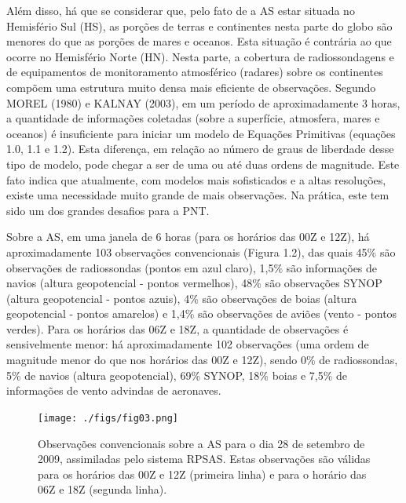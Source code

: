 Além disso, há que se considerar que, pelo fato de a AS estar situada no Hemisfério Sul (HS), as porções de terras e continentes nesta parte do globo são menores do que as porções de mares e oceanos. Esta situação é contrária ao que ocorre no Hemisfério Norte (HN). Nesta parte, a cobertura de radiossondagens e de equipamentos de monitoramento atmosférico (radares) sobre os continentes compõem uma estrutura muito densa mais eficiente de observações. Segundo MOREL (1980) e KALNAY (2003), em um período de aproximadamente 3 horas, a quantidade de informações coletadas (sobre a superfície, atmosfera, mares e oceanos) é insuficiente para iniciar um modelo de Equações Primitivas (equações 1.0, 1.1 e 1.2). Esta diferença, em relação ao número de graus de liberdade desse tipo de modelo, pode chegar a ser de uma ou até duas ordens de magnitude. Este fato indica que atualmente, com modelos mais sofisticados e a altas resoluções, existe uma necessidade muito grande de mais observações. Na prática, este tem sido um dos grandes desafios para a PNT. 

Sobre a AS, em uma janela de 6 horas (para os horários das 00Z e 12Z), há aproximadamente 103 observações convencionais (Figura 1.2), das quais 45\% são observações de radiossondas (pontos em azul claro), 1,5\% são informações de navios (altura geopotencial - pontos vermelhos), 48\% são observações SYNOP (altura geopotencial - pontos azuis), 4\% são observações de boias (altura geopotencial - pontos amarelos) e 1,4\% são observações de aviões (vento - pontos verdes). Para os horários das 06Z e 18Z, a quantidade de observações é sensivelmente menor: há aproximadamente 102 observações (uma ordem de magnitude menor do que nos horários das 00Z e 12Z), sendo 0\% de radiossondas, 5\% de navios (altura geopotencial), 69\% SYNOP, 18\% boias e 7,5\% de informações de vento advindas de aeronaves.

\begin{figure}
\centering
\texttt{[image: ./figs/fig03.png]}
\caption{Observações convencionais sobre a AS para o dia 28 de setembro de 2009, assimiladas pelo sistema RPSAS. Estas observações são válidas para os horários das 00Z e 12Z (primeira linha) e para o horário das 06Z e 18Z (segunda linha).}
\label{fig03}
\end{figure}

